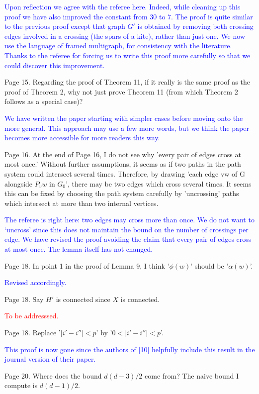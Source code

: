 \documentclass[12pt]{article}
\newcommand{\changed}{\textcolor{blue}{Revised accordingly.}}
\newcommand{\tba}{\textcolor{red}{To be addresssed.}}
\begin{document}
\textcolor{blue}{Upon reflection we agree with the referee here. Indeed, while cleaning up this proof we have also improved the constant from $30$ to $7$. The proof is quite similar to the previous proof except that graph $G'$ is obtained by removing both crossing edges involved in a crossing (the spars of a kite), rather than just one.  We now use the language of framed multigraph, for consistency with the literature. Thanks to the referee for forcing us to write this proof more carefully so that we could discover this improvement.}

Page 15. Regarding the proof of Theorem 11, if it really is the same
proof as the proof of Theorem 2, why not just prove Theorem 11 (from
which Theorem 2 follows as a special case)?

\textcolor{blue}{We have written the paper starting with simpler cases before moving onto the more general. This approach may use a few more words, but we think the paper becomes more accessible for more readers this way.}

Page 16.  At the end of Page 16, I do not see why 'every pair of edges
cross at most once.'  Without further assumptions, it seems as if two
paths in the path system could intersect several times.  Therefore, by
drawing 'each edge vw of G alongside $P_vw$ in $G_0$', there may be two
edges which cross several times.  It seems this can be fixed by
choosing the path system carefully by 'uncrossing' paths which
intersect at more than two internal vertices.

\textcolor{blue}{The referee is right here: two edges may cross more than once. We do not want to `uncross' since this does not maintain the bound on the number of crossings per edge. We have revised the proof avoiding the claim that every pair of edges cross at most once. The lemma itself has not changed.}

Page 18. In point 1 in the proof of Lemma 9, I think '$\phi(w)$' should
be '$\alpha(w)$'.

\changed

Page 18.  Say $H'$ is connected since $X$ is connected.

\tba

Page 18.  Replace '$|i'-i''| < p$' by  '$0< |i'-i''| < p$'.

\textcolor{blue}{This proof is now gone since the authors of [10] helpfully include this result in the journal version of their paper.}

Page 20.  Where does the bound $d(d-3)/2$ come from?  The naive bound I
compute is $d(d-1)/2$.
\end{document}
